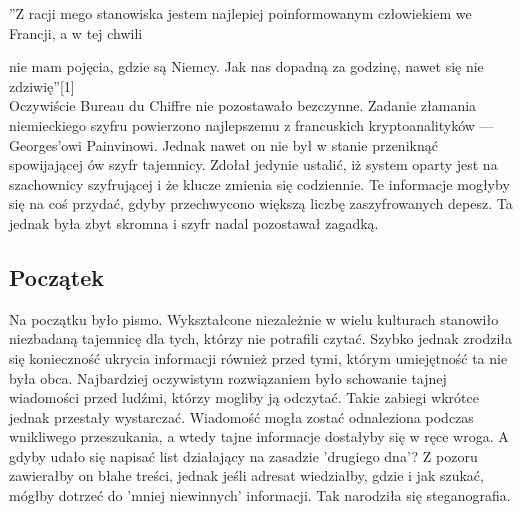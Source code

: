 \documentclass[a4paper]{article}
\begin{document}
\noindent ”Z racji mego stanowiska jestem najlepiej poinformowanym człowiekiem we Francji, a w tej chwili
\par nie mam pojęcia, gdzie są Niemcy. Jak nas dopadną za godzinę, nawet się nie zdziwię”[1]\\

\noindent Oczywiście Bureau du Chiffre nie pozostawało bezczynne. Zadanie złamania niemieckiego szyfru
powierzono najlepszemu z francuskich kryptoanalityków — Georges’owi Painvinowi. Jednak nawet
on nie był w stanie przeniknąć spowijającej ów szyfr tajemnicy. Zdołał jedynie ustalić, iż system
oparty jest na szachownicy szyfrującej i że klucze zmienia się codziennie. Te informacje mogłyby się
na coś przydać, gdyby przechwycono większą liczbę zaszyfrowanych depesz. Ta jednak była zbyt
skromna i szyfr nadal pozostawał zagadką.

\subsection{Początek}
Na początku było pismo. Wykształcone niezależnie w wielu kulturach stanowiło niezbadaną tajemnicę dla tych, którzy nie potrafili czytać. Szybko jednak zrodziła się konieczność ukrycia informacji
również przed tymi, którym umiejętność ta nie była obca. Najbardziej oczywistym rozwiązaniem
było schowanie tajnej wiadomości przed ludźmi, którzy mogliby ją odczytać. Takie zabiegi wkrótce
jednak przestały wystarczać. Wiadomość mogła zostać odnaleziona podczas wnikliwego przeszukania, a wtedy tajne informacje dostałyby się w ręce wroga. A gdyby udało się napisać list działający
na zasadzie ’drugiego dna’? Z pozoru zawierałby on błahe treści, jednak jeśli adresat wiedziałby,
gdzie i jak szukać, mógłby dotrzeć do ’mniej niewinnych’ informacji. Tak narodziła się steganografia.
\end{document}
